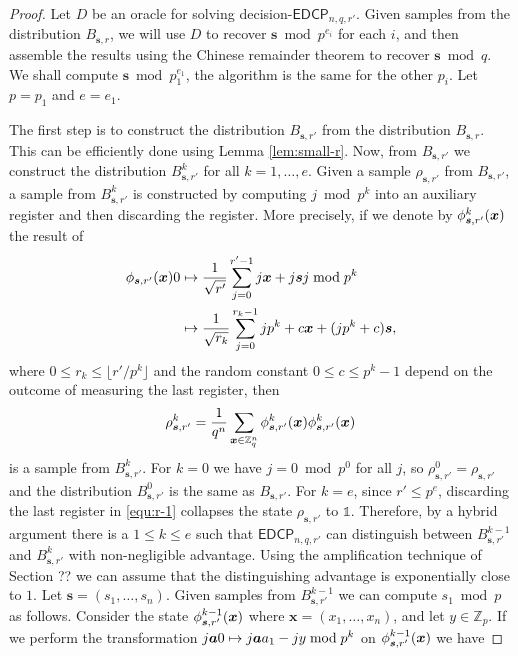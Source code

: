 \documentclass[11pt]{article}
\theoremstyle{plain}
\theoremstyle{definition}
\let\ket\relax
\DeclarePairedDelimiter{\ket}{\lvert}{\rangle}
\let\bra\relax
\DeclarePairedDelimiter{\bra}{\langle}{\rvert}
\def\Z{\mathbb{Z}}
\def\edcp{\mathsf{EDCP}}
\begin{document}
\begin{proof}
    Let $D$ be an oracle for solving decision-$\edcp_{n, q, r'}$. Given samples from the distribution $B_{\bm{s}, r}$, we will use $D$ to recover $\bm{s} \bmod p^{e_i}$ for each $i$, and then assemble the results using the Chinese remainder theorem to recover $\bm{s} \bmod q$. We shall compute $\bm{s} \bmod p_1^{e_1}$, the algorithm is the same for the other $p_i$. Let $p = p_1$ and $e = e_1$.

    The first step is to construct the distribution $B_{\bm{s}, r'}$ from the distribution $B_{\bm{s}, r}$. This can be efficiently done using Lemma \ref{lem:small-r}. Now, from $B_{\bm{s}, r'}$ we construct the distribution $B_{\bm{s}, r'}^k$ for all $k = 1, \dots, e$. Given a sample $\rho_{\bm{s}, r'}$ from $B_{\bm{s}, r'}$, a sample from $B_{\bm{s}, r'}^k$ is constructed by computing $j \bmod p^k$ into an auxiliary register and then discarding the register. More precisely, if we denote by  $\ket{\phi_{\bm{s}, r'}^k(\bm{x})}$ the result of 
    \begin{align}
        \ket{\phi_{\bm{s}, r'}(\bm{x})}\ket{0}
        & \mapsto \frac{1}{\sqrt{r'}} \sum_{j = 0}^{r' - 1} \ket{j}\ket{\bm{x} + j\bm{s}}\ket{j \bmod p^k} \label{equ:r-1}  \\
        & \mapsto \frac{1}{\sqrt{r_k}} \sum_{j = 0}^{r_k - 1} \ket{jp^k + c}\ket{\bm{x} + (jp^k + c)\bm{s}}, \nonumber
    \end{align}
    where $0 \le r_k \le \lfloor r' / p^k \rfloor$ and the random constant $0 \le c \le p^k - 1$ depend on the outcome of measuring the last register, then
    \[ \rho_{\bm{s}, r'}^k = \frac{1}{q^n} \sum_{\bm{x} \in \Z_q^n} \ket{\phi_{\bm{s}, r'}^k(\bm{x})} \bra{\phi_{\bm{s}, r'}^k(\bm{x})} \]
    is a sample from $B_{\bm{s}, r'}^k$. For $k = 0$ we have $j = 0 \bmod p^0$ for all $j$, so $\rho_{\bm{s}, r'}^0 = \rho_{\bm{s}, r'}$ and the distribution $B_{\bm{s}, r'}^0$ is the same as $B_{\bm{s}, r'}$. For $k = e$, since $r' \le p^e$, discarding the last register in \eqref{equ:r-1} collapses the state $\rho_{\bm{s}, r'}$ to $\mathds{1}$. Therefore, by a hybrid argument there is a $1 \le k \le e$ such that $\edcp_{n, q, r'}$ can distinguish between $B_{\bm{s}, r'}^{k - 1}$ and $B_{\bm{s}, r'}^k$ with non-negligible advantage. Using the amplification technique of Section ?? we can assume that the distinguishing advantage is exponentially close to $1$. Let $\bm{s} = (s_1, \dots, s_n)$. Given samples from $B_{\bm{s}, r'}^{k - 1}$ we can compute $s_1 \bmod p$ as follows. Consider the state $\ket{\phi_{\bm{s}, r'}^{k - 1}(\bm{x})}$ where $\bm{x} = (x_1, \dots, x_n)$, and let $y \in \Z_p$. If we perform the transformation $\ket{j}\ket{\bm{a}}\ket{0} \mapsto \ket{j}\ket{\bm{a}}\ket{a_1 - jy \bmod p^k}$ on $\ket{\phi_{\bm{s}, r'}^{k - 1}(\bm{x})}$ we have

\end{proof}
\end{document}
